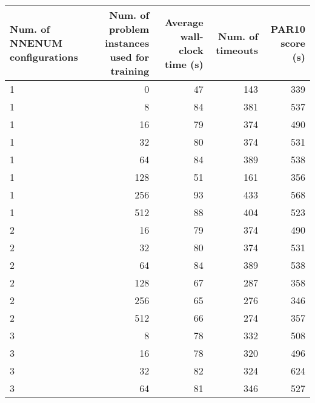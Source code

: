 \begin{tabular}{lrrrr}
\toprule
Num. of NNENUM configurations & Num. of problem instances used for training & Average wall-clock time (s) & Num. of timeouts & PAR10 score (s) \\
\midrule
1 & 0 & 47 & 143 & 339 \\
1 & 8 & 84 & 381 & 537 \\
1 & 16 & 79 & 374 & 490 \\
1 & 32 & 80 & 374 & 531 \\
1 & 64 & 84 & 389 & 538 \\
1 & 128 & 51 & 161 & 356 \\
1 & 256 & 93 & 433 & 568 \\
1 & 512 & 88 & 404 & 523 \\
2 & 16 & 79 & 374 & 490 \\
2 & 32 & 80 & 374 & 531 \\
2 & 64 & 84 & 389 & 538 \\
2 & 128 & 67 & 287 & 358 \\
2 & 256 & 65 & 276 & 346 \\
2 & 512 & 66 & 274 & 357 \\
3 & 8 & 78 & 332 & 508 \\
3 & 16 & 78 & 320 & 496 \\
3 & 32 & 82 & 324 & 624 \\
3 & 64 & 81 & 346 & 527 \\
\bottomrule
\end{tabular}
